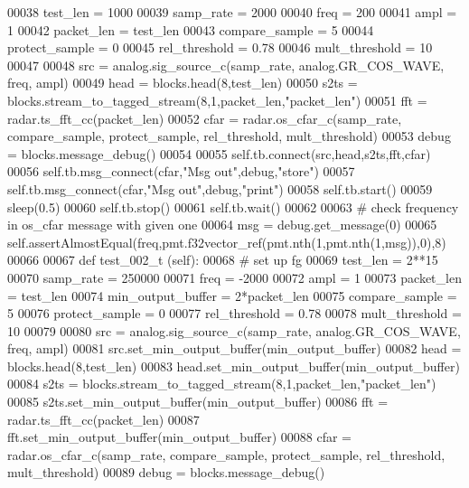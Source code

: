 \begin{DoxyCode}
00038         test\_len = 1000
00039         samp\_rate = 2000
00040         freq = 200
00041         ampl = 1
00042         packet\_len = test\_len
00043         compare\_sample = 5
00044         protect\_sample = 0
00045         rel\_threshold = 0.78
00046         mult\_threshold = 10
00047         
00048         src = analog.sig\_source\_c(samp\_rate, analog.GR\_COS\_WAVE, freq, ampl)
00049         head = blocks.head(8,test\_len)
00050         s2ts = blocks.stream\_to\_tagged\_stream(8,1,packet\_len,\textcolor{stringliteral}{"packet\_len"})
00051         fft = radar.ts\_fft\_cc(packet\_len)
00052         cfar = radar.os\_cfar\_c(samp\_rate, compare\_sample, protect\_sample, rel\_threshold, mult\_threshold)
00053         debug = blocks.message\_debug()
00054         
00055         self.tb.connect(src,head,s2ts,fft,cfar)
00056         self.tb.msg\_connect(cfar,\textcolor{stringliteral}{"Msg out"},debug,\textcolor{stringliteral}{"store"})
00057         self.tb.msg\_connect(cfar,\textcolor{stringliteral}{"Msg out"},debug,\textcolor{stringliteral}{"print"})
00058         self.tb.start()
00059         sleep(0.5)
00060         self.tb.stop()
00061         self.tb.wait()
00062         
00063         \textcolor{comment}{# check frequency in os\_cfar message with given one}
00064         msg = debug.get\_message(0)
00065         self.assertAlmostEqual(freq,pmt.f32vector\_ref(pmt.nth(1,pmt.nth(1,msg)),0),8)
00066         
00067     \textcolor{keyword}{def }test_002_t (self):
00068         \textcolor{comment}{# set up fg}
00069         test\_len = 2**15
00070         samp\_rate = 250000
00071         freq = -2000
00072         ampl = 1
00073         packet\_len = test\_len
00074         min\_output\_buffer = 2*packet\_len
00075         compare\_sample = 5
00076         protect\_sample = 0
00077         rel\_threshold = 0.78
00078         mult\_threshold = 10
00079         
00080         src = analog.sig\_source\_c(samp\_rate, analog.GR\_COS\_WAVE, freq, ampl)
00081         src.set\_min\_output\_buffer(min\_output\_buffer)
00082         head = blocks.head(8,test\_len)
00083         head.set\_min\_output\_buffer(min\_output\_buffer)
00084         s2ts = blocks.stream\_to\_tagged\_stream(8,1,packet\_len,\textcolor{stringliteral}{"packet\_len"})
00085         s2ts.set\_min\_output\_buffer(min\_output\_buffer)
00086         fft = radar.ts\_fft\_cc(packet\_len)
00087         fft.set\_min\_output\_buffer(min\_output\_buffer)
00088         cfar = radar.os\_cfar\_c(samp\_rate, compare\_sample, protect\_sample, rel\_threshold, mult\_threshold)
00089         debug = blocks.message\_debug()

\end{DoxyCode}
